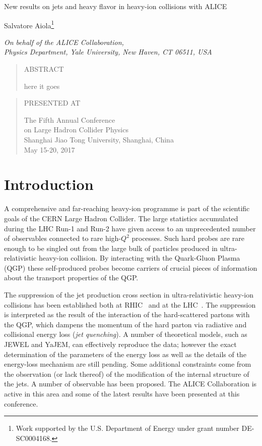 \documentclass[10pt]{article}
\def\Title#1{\begin{center} {\Large #1 } \end{center}}
\def\Author#1{\begin{center}{ \sc #1} \end{center}}
\def\Address#1{\begin{center}{ \it #1} \end{center}}
\newcommand\pubblock{\rightline{\begin{tabular}{l} Proceedings of the Fifth Annual LHCP\\ \pubnumber\\
         \pubdate  \end{tabular}}}
\newenvironment{Abstract}{\begin{quotation} \begin{center} 
             \large ABSTRACT \end{center}\bigskip 
      \begin{center}\begin{large}}{\end{large}\end{center} \end{quotation}}
\newenvironment{Presented}{\begin{quotation} \begin{center} 
             PRESENTED AT\end{center}\bigskip 
      \begin{center}\begin{large}}{\end{large}\end{center} \end{quotation}}
\newcommand\pubnumber{ }
\newcommand\pubdate{\today}
\def\affiliation{
On behalf of the ALICE Collaboration, \\
Physics Department, Yale University, New Haven, CT 06511, USA}
\def\support{\footnote{Work supported by the U.S. Department of Energy under grant number DE-SC0004168.}}
\begin{document}
\large
\begin{titlepage}
\pubblock


\vfill
\Title{New results on jets and heavy flavor in heavy-ion collisions with ALICE}
\vfill

\Author{Salvatore Aiola\support}
\Address{\affiliation}
\vfill
\begin{Abstract}

here it goes

\end{Abstract}
\vfill

\begin{Presented}
The Fifth Annual Conference\\
 on Large Hadron Collider Physics \\
Shanghai Jiao Tong University, Shanghai, China\\ 
May 15-20, 2017
\end{Presented}
\vfill
\end{titlepage}
\def\thefootnote{\fnsymbol{footnote}}
\setcounter{footnote}{0}
%

\normalsize 


\section{Introduction}
A comprehensive and far-reaching heavy-ion programme is part of the scientific goals of the CERN Large Hadron Collider.
The large statistics accumulated during the LHC Run-1 and Run-2 have given access to an unprecedented number of observables connected to rare high-$Q^2$ processes.
Such hard probes are rare enough to be singled out from the large bulk of particles produced in ultra-relativistic heavy-ion collision. By interacting with the Quark-Gluon Plasma (QGP) these self-produced probes
become carriers of crucial pieces of information about the transport properties of the QGP.

The suppression of the jet production cross section in ultra-relativistic heavy-ion collisions has been established both at RHIC~\cite{STAR:2017a} and at the LHC~\cite{ALICE:2015a}. The suppression is interpreted as the result of the interaction of the hard-scattered partons 
with the QGP, which dampens the momentum of the hard parton via radiative and collisional energy loss (\emph{jet quenching}). A number of theoretical models, such as JEWEL and YaJEM, can effectively reproduce
the data; however the exact determination of the parameters of the energy loss as well as the details of the energy-loss mechanism are still pending. Some additional constraints come from the observation (or lack thereof) of
the modification of the internal structure of the jets. A number of observable has been proposed. The ALICE Collaboration is active in this area and some of the latest results have been presented at this conference.
\end{document}
